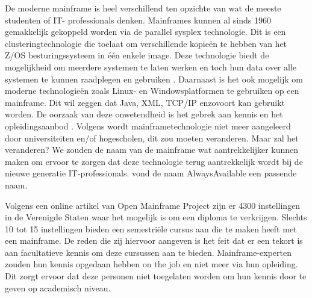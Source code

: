 De moderne mainframe is heel verschillend ten opzichte van wat de meeste studenten of IT- professionals denken. Mainframes kunnen al sinds 1960 gemakkelijk gekoppeld worden via de parallel sysplex technologie. Dit is een clusteringtechnologie die toelaat om verschillende kopieën te hebben van het Z/OS besturingssysteem in één enkele image. Deze technologie biedt de mogelijkheid om meerdere systemen te laten werken en toch hun data over alle systemen te kunnen raadplegen en gebruiken \autocite{Sarkar2020}. Daarnaast is het ook mogelijk om moderne technologieën zoals Linux- en Windowsplatformen te gebruiken op een mainframe. Dit wil zeggen dat Java, XML, TCP/IP enzovoort kan gebruikt worden. De oorzaak van deze onwetendheid is het gebrek aan kennis en het opleidingsaanbod \autocite{Mullins2016}. Volgens \textcite{Mullins2016} wordt mainframetechnologie niet meer aangeleerd door universiteiten en/of hogescholen, dit zou moeten veranderen. Maar zal het veranderen? We zouden de naam van de mainframe wat aantrekkelijker kunnen maken om ervoor te zorgen dat deze technologie terug aantrekkelijk wordt bij de nieuwe generatie IT-professionals. \textcite{Mullins2016} vond de naam AlwaysAvailable een passende naam.


Volgens een online artikel van Open Mainframe Project \autocite{2020} zijn er 4300 instellingen in de Verenigde Staten waar het mogelijk is om een diploma te verkrijgen. Slechts 10 tot 15 instellingen bieden een semestriële cursus aan die te maken heeft met een mainframe. De reden die zij hiervoor aangeven is het feit dat er een tekort is aan facultatieve kennis om deze cursussen aan te bieden. Mainframe-experten zouden hun kennis opgedaan hebben on the job en niet meer via hun opleiding. Dit zorgt ervoor dat deze personen niet toegelaten worden om hun kennis door te geven op academisch niveau. 

\section{}
\label{sec:De laatste nieuwe mainframe technologie}


